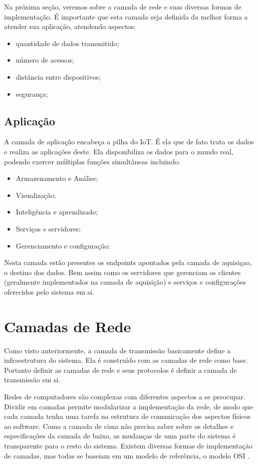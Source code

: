Na próxima seção, veremos sobre a camada de rede e suas diversas formas de implementação. É importante que esta camada seja definida da melhor forma a atender sua aplicação, atendendo aspectos: 
\begin{itemize}
\item quantidade de dados transmitido;
\item número de acessos; 
\item distância entre dispositivos;
\item segurança;
\end{itemize}

\subsection{Aplicação}
\label{subsection:aplicacao}

A camada de aplicação encabeça a pilha do IoT. É ela que de fato trata os dados e realiza as aplicações deste. Ela disponibiliza os dados para o mundo real, podendo exercer múltiplas funções simultâneas incluindo:

\begin{itemize}
\item Armazenamento e Análise;
\item Visualização; 
\item Inteligência e aprendizado;
\item Serviços e servidores;
\item Gerenciamento e configuração;
\end{itemize}

Nesta camada estão presentes os endpoints apontados pela camada de aquisiçao, o destino dos dados. Bem assim como os servidores que gerenciam os clientes (geralmente implementados na camada de aquisição) e serviços e configurações oferecidos pelo sistema em si.

\section{Camadas de Rede}
\label{section:camadas_de_rede}

Como visto anteriormente, a camada de transmissão basicamente define a infraestrutura do sistema. Ela é construído com as camadas de rede como base. Portanto definir as camadas de rede e seus protocolos é definir a camada de transmissão em si.

Redes de computadores são complexas com diferentes aspectos a se preocupar. Dividir em camadas permite modularizar a implementação da rede, de modo que cada camada tenha uma tarefa na estrutura de comunicação dos aspectos físicos ao software. Como a camada de cima não precisa saber sobre os detalhes e especificações da camada de baixo, as mudanças de uma parte do sistema é transparente para o resto do sistema. Existem diversas formas de implementação de camadas, mas todas se baseiam em um modelo de referência, o modelo OSI \cite{Zimmermann:1988:ORM:59309.59310}.


